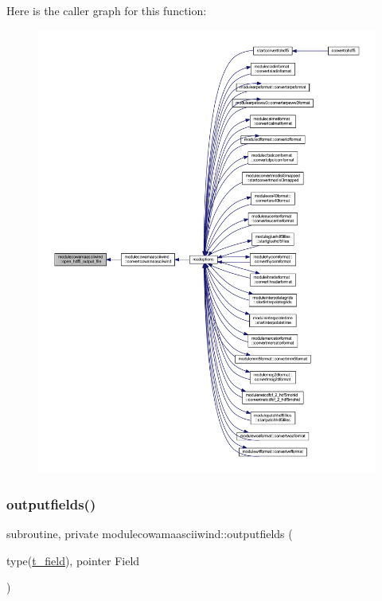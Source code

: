 Here is the caller graph for this function\+:\nopagebreak
\begin{figure}[H]
\begin{center}
\leavevmode
\includegraphics[width=350pt]{namespacemodulecowamaasciiwind_aea5f2ecc6c72b859765645c42c117f81_icgraph}
\end{center}
\end{figure}
\mbox{\label{namespacemodulecowamaasciiwind_a67476e8fa757d63b3e48664bcc8b1b96}} 
\subsubsection{\texorpdfstring{outputfields()}{outputfields()}}
{\footnotesize\ttfamily subroutine, private modulecowamaasciiwind\+::outputfields (\begin{DoxyParamCaption}\item[{type(\mbox{\hyperlink{structmodulecowamaasciiwind_1_1t__field}{t\+\_\+field}}), pointer}]{Field }\end{DoxyParamCaption})\hspace{0.3cm}{\ttfamily [private]}}

